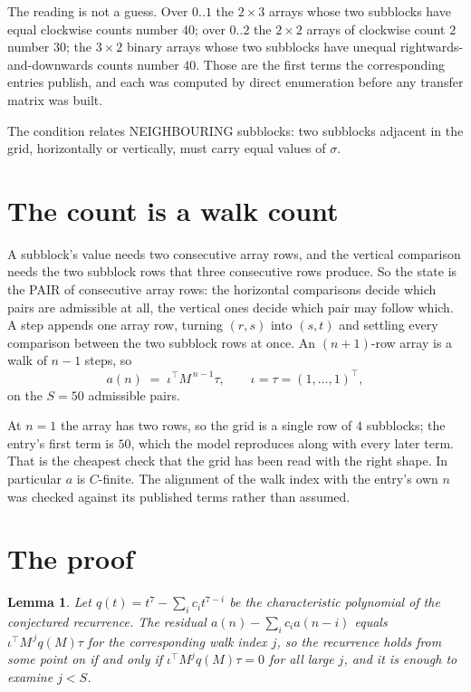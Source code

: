 \documentclass[11pt,a4paper]{article}
\theoremstyle{plain}
\newtheorem{lemma}[theorem]{Lemma}
\theoremstyle{definition}
\begin{document}
The reading is not a guess. Over $0..1$ the $2\times3$ arrays whose two subblocks have equal
clockwise counts number $40$; over $0..2$ the $2\times2$ arrays of clockwise count $2$ number
$30$; the $3\times2$ binary arrays whose two subblocks have unequal rightwards-and-downwards
counts number $40$. Those are the first terms the corresponding entries publish, and each was
computed by direct enumeration before any transfer matrix was built.

The condition relates NEIGHBOURING subblocks: two subblocks adjacent in the grid, horizontally
or vertically, must carry equal values of $\sigma$.

\section{The count is a walk count}

A subblock's value needs two consecutive array rows, and the vertical
comparison needs the two subblock rows that three consecutive rows produce. So the state is the
PAIR of consecutive array rows: the horizontal comparisons decide which pairs are admissible at
all, the vertical ones decide which pair may follow which. A step appends one array row,
turning $(r,s)$ into $(s,t)$ and settling every comparison between the two subblock rows at
once. An $(n+1)$-row array is a walk of $n-1$ steps, so
\[
a(n)\;=\;\iota^{\!\top}M^{\,n-1}\tau,\qquad\iota=\tau=(1,\dots,1)^{\!\top},
\]
on the $S=50$ admissible pairs.

At $n=1$ the array has two rows, so the grid is a single row of $4$
subblocks; the entry's first term is $50$, which the model
reproduces along with every later term. That is the cheapest check that the grid has been read
with the right shape.
In particular $a$ is $C$-finite. The alignment of the walk index with the entry's own $n$ was
checked against its published terms rather than assumed.

\section{The proof}

\begin{lemma}\label{lem:crit}
Let $q(t)=t^{7}-\sum_i c_it^{7-i}$ be the characteristic polynomial of the
conjectured recurrence. The residual $a(n)-\sum_ic_ia(n-i)$ equals
$\iota^{\!\top}M^{\,j}q(M)\tau$ for the corresponding walk index $j$, so the recurrence
holds from some point on if and only if $\iota^{\!\top}M^{j}q(M)\tau=0$ for all large $j$,
and it is enough to examine $j<S$.
\end{lemma}
\end{document}
